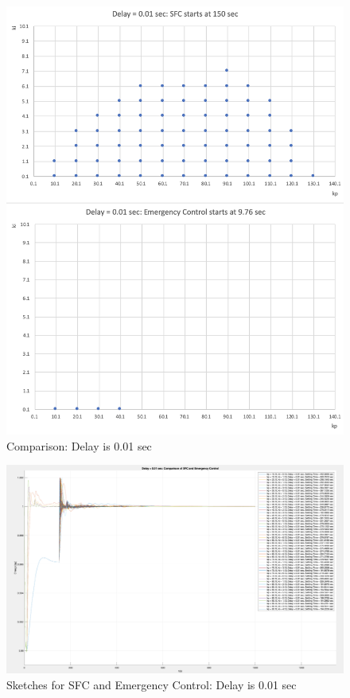 \begin{figure}[htbp]
\centering
\includegraphics[width = .891\textwidth]{figure/6_4_copare_01.png}
\caption{Comparison: Delay is 0.01 sec}
\label{6_4_copare_01}
\end{figure}

\begin{figure}[htbp]
\centering
\includegraphics[width = .891\textwidth]{figure/6_4_CompaPlots_01.png}
\caption{Sketches for SFC and Emergency Control: Delay is 0.01 sec}
\label{6_4_CompaPlots_01}
\end{figure}


